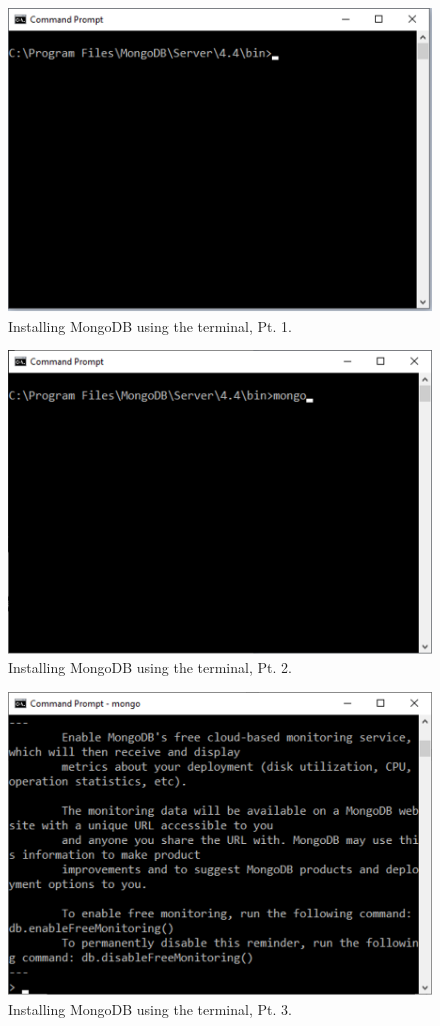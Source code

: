 \documentclass[titlepage, 12pt]{article}
\begin{document}
\begin{figure}[p]
    \centering\includegraphics[width=0.75\linewidth]{images/mongodb-terminal-1.png}
    \caption{Installing MongoDB using the terminal, Pt. 1.}
\end{figure}

\begin{figure}[p]
    \centering\includegraphics[width=0.75\linewidth]{images/mongodb-terminal-2.png}
    \caption{Installing MongoDB using the terminal, Pt. 2.}
\end{figure}

\begin{figure}[p]
    \centering\includegraphics[width=0.75\linewidth]{images/mongodb-terminal-3.png}
    \caption{Installing MongoDB using the terminal, Pt. 3.}
\end{figure}
\end{document}
